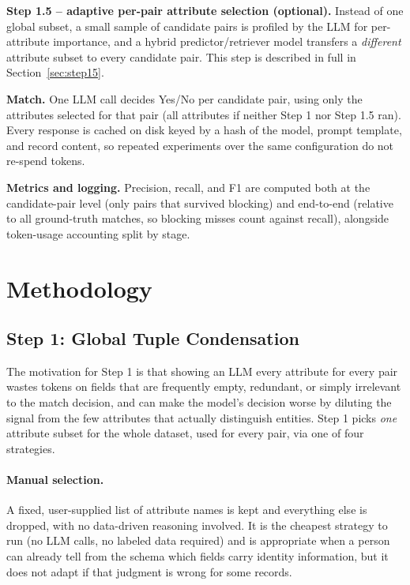 \documentclass[11pt]{article}
\begin{document}
\textbf{Step 1.5 -- adaptive per-pair attribute selection (optional).} Instead of one
global subset, a small sample of candidate pairs is profiled by the LLM for
per-attribute importance, and a hybrid predictor/retriever model transfers a
\emph{different} attribute subset to every candidate pair. This step is described in
full in Section~\ref{sec:step15}.

\textbf{Match.} One LLM call decides Yes/No per candidate pair, using only the
attributes selected for that pair (all attributes if neither Step 1 nor Step 1.5
ran). Every response is cached on disk keyed by a hash of the model, prompt
template, and record content, so repeated experiments over the same configuration
do not re-spend tokens.

\textbf{Metrics and logging.} Precision, recall, and F1 are computed both at the
candidate-pair level (only pairs that survived blocking) and end-to-end (relative to
all ground-truth matches, so blocking misses count against recall), alongside
token-usage accounting split by stage.

\section{Methodology}
\label{sec:methodology}

\subsection{Step 1: Global Tuple Condensation}
\label{sec:step1}

The motivation for Step 1 is that showing an LLM every attribute for every pair
wastes tokens on fields that are frequently empty, redundant, or simply irrelevant
to the match decision, and can make the model's decision worse by diluting the
signal from the few attributes that actually distinguish entities. Step 1 picks
\emph{one} attribute subset for the whole dataset, used for every pair, via one of
four strategies.

\paragraph{Manual selection.} A fixed, user-supplied list of attribute names is kept
and everything else is dropped, with no data-driven reasoning involved. It is the
cheapest strategy to run (no LLM calls, no labeled data required) and is appropriate
when a person can already tell from the schema which fields carry identity
information, but it does not adapt if that judgment is wrong for some records.
\end{document}
